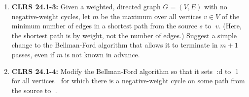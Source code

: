 \documentclass[12pt]{article}
\begin{document}
\begin{enumerate}[1.]
    \item \textbf{CLRS 24.1-3:}
    Given a weighted, directed graph $G = (V,E)$ with no negative-weight cycles,
    let $m$ be the maximum over all vertices $v \in V$ of the minimum number of edges
    in a shortest path from the source $s$ to $v$. (Here, the shortest path is by weight, not
    the number of edges.) Suggest a simple change to the Bellman-Ford algorithm that
    allows it to terminate in $m + 1$ passes, even if $m$ is not known in advance.

    \item \textbf{CLRS 24.1-4:} Modify the Bellman-Ford algorithm so that it sets :d to 1 for all vertices  for
    which there is a negative-weight cycle on some path from the source to .

\end{enumerate}
\end{document}
